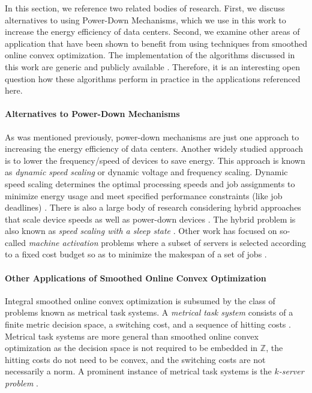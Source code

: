 In this section, we reference two related bodies of research. First, we discuss alternatives to using Power-Down Mechanisms, which we use in this work to increase the energy efficiency of data centers. Second, we examine other areas of application that have been shown to benefit from using techniques from smoothed online convex optimization. The implementation of the algorithms discussed in this work are generic and publicly available \cite{Hübotter2021}. Therefore, it is an interesting open question how these algorithms perform in practice in the applications referenced here.

\paragraph{Alternatives to Power-Down Mechanisms} As was mentioned previously, power-down mechanisms are just one approach to increasing the energy efficiency of data centers. Another widely studied approach is to lower the frequency/speed of devices to save energy. This approach is known as \emph{dynamic speed scaling} or dynamic voltage and frequency scaling. Dynamic speed scaling determines the optimal processing speeds and job assignments to minimize energy usage and meet specified performance constraints (like job deadlines) \cite{Albers2007, Albers2011, Jin2016}. There is also a large body of research considering hybrid approaches that scale device speeds as well as power-down devices \cite{Jin2016}. The hybrid problem is also known as \emph{speed scaling with a sleep state} \cite{Albers2014}. Other work has focused on so-called \emph{machine activation} problems where a subset of servers is selected according to a fixed cost budget so as to minimize the makespan of a set of jobs \cite{Khuller2009, Li2011}.

\paragraph{Other Applications of Smoothed Online Convex Optimization} Integral smoothed online convex optimization is subsumed by the class of problems known as metrical task systems. A \emph{metrical task system} consists of a finite metric decision space, a switching cost, and a sequence of hitting costs \cite{Bubeck2018_3}. Metrical task systems are more general than smoothed online convex optimization as the decision space is not required to be embedded in $\mathbb{Z}$, the hitting costs do not need to be convex, and the switching costs are not necessarily a norm. A prominent instance of metrical task systems is the \emph{$k$-server problem} \cite{Bubeck2017}.

